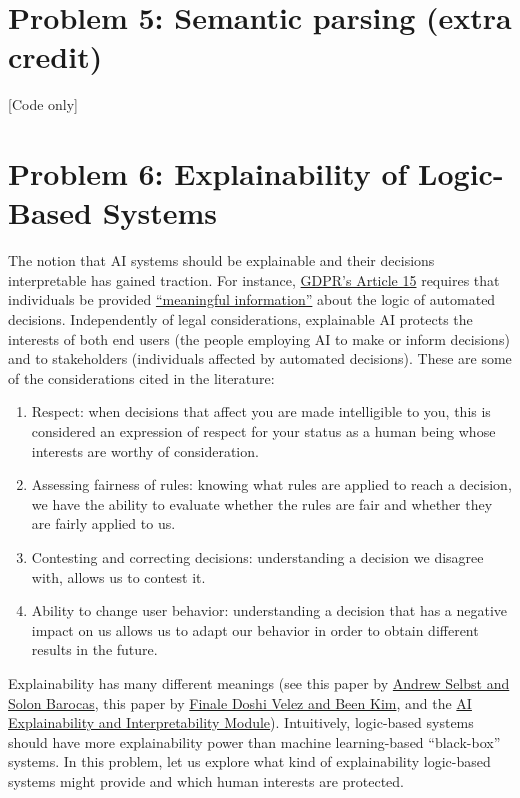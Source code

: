 \documentclass{article}
\theoremstyle{case}
\theoremstyle{definition}
\begin{document}
\section*{Problem 5:  Semantic parsing (extra credit)}
[Code only]


\section*{Problem 6: Explainability of Logic-Based Systems}

The notion that AI systems should be explainable and their decisions interpretable has gained traction. For instance, \href{https://gdpr-text.com/read/article-15/#related_gdpr-a-15_1h} {GDPR’s Article 15} requires that individuals be provided 
\href{https://academic.oup.com/idpl/article/7/4/233/4762325} {“meaningful information”} about the logic of automated decisions. Independently of legal considerations, explainable AI protects the interests of both end users (the people employing AI to make or inform decisions) and to stakeholders (individuals affected by automated decisions). These are some of the considerations cited in the literature:
\begin{enumerate}
    \item Respect: when decisions that affect you are made intelligible to you, this is considered an expression of respect for your status as a human being whose interests are worthy of consideration.
    \item Assessing fairness of rules: knowing what rules are applied to reach a decision, we have the ability to evaluate whether the rules are fair and whether they are fairly applied to us.
    \item Contesting and correcting decisions: understanding a decision we disagree with, allows us to contest it.
    \item Ability to change user behavior: understanding a decision that has a negative impact on us allows us to adapt our behavior in order to obtain different results in the future.
\end{enumerate}

Explainability has many different meanings (see this paper by \href{https://ir.lawnet.fordham.edu/cgi/viewcontent.cgi?article=5569&context=flr} {Andrew Selbst and Solon Barocas}, this paper by \href{https://arxiv.org/pdf/1702.08608.pdf} {Finale Doshi Velez and Been Kim}, and the \href{https://drive.google.com/file/d/10_VksMdeu8TywR6x3CAqXYO2V3DeFf0W/view?usp=sharing}{AI Explainability and Interpretability Module}). Intuitively, logic-based systems should have more explainability power than machine learning-based “black-box” systems. In this problem, let us explore what kind of explainability logic-based systems might provide and which human interests are protected.\\
\end{document}
